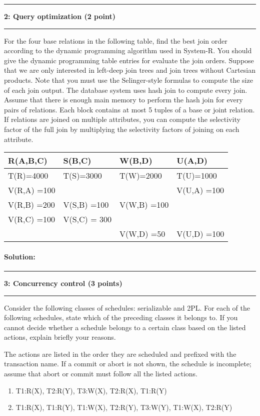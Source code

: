 \documentclass[11pt]{article}
\newcommand\question[2]{\vspace{.25in}\hrule\textbf{#1: #2}\vspace{.5em}\hrule\vspace{.10in}}
\begin{document}
\question{2}{Query optimization  (2 point)}
For the four base relations in the following table, 
find the best join order according to 
the dynamic programming algorithm used in System-R. 
You should give the dynamic programming table entries 
for evaluate the join orders.
Suppose that we are only interested in left-deep join trees and 
join trees without Cartesian products. 
Note that you must use the Selinger-style formulas to compute the size of each join output.
The database system uses hash join to compute every join.
Assume that there is enough main memory to perform the hash join for every pairs of relations.
Each block contains at most 5 tuples of a base or joint relation.
If relations are joined on multiple attributes, you can compute the selectivity factor of the full join by multiplying the 
selectivity factors of joining on each attribute.

		
\begin{tabular}{ |l| l | l|l|}
\hline
  R(A,B,C) & S(B,C) & W(B,D) & U(A,D) \\\hline
  T(R)=4000 & T(S)=3000& T(W)=2000 & T(U)=1000 \\\hline
  V(R,A) =100 &  & & V(U,A) =100\\
  V(R,B) =200 & V(S,B) =100& V(W,B) =100& \\
  V(R,C) =100 & V(S,C) = 300&&\\
  & & V(W,D) =50 & V(U,D) =100\\\hline
\end{tabular}

\paragraph{Solution:} \hfill \break




\question{3}{Concurrency control (3 points)}
Consider the following classes of schedules: serializable and 2PL. 
For each of the following schedules, state which of the preceding classes it belongs to. 
If you cannot decide whether a schedule belongs to a certain class based on the listed actions, explain briefly your reasons.

The actions are listed in the order they are scheduled and prefixed with the transaction name. 
If a commit or abort is not shown, the schedule is incomplete; assume that abort or commit must follow all the listed actions.


\begin{enumerate}
\item T1:R(X), T2:R(Y), T3:W(X), T2:R(X), T1:R(Y)
\item T1:R(X), T1:R(Y), T1:W(X), T2:R(Y), T3:W(Y), T1:W(X), T2:R(Y)
\end{enumerate}
\end{document}
